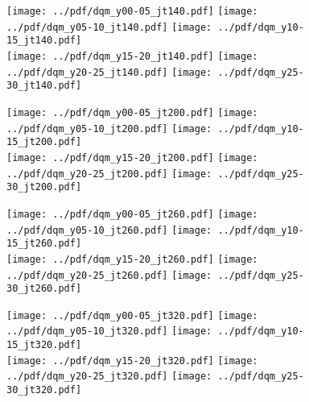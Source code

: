 \documentclass[landscape,10pt]{beamer} %
\begin{document}
\newpage

\begin{figure}[p]
\centering
\texttt{[image: ../pdf/dqm\_y00-05\_jt140.pdf]}
\texttt{[image: ../pdf/dqm\_y05-10\_jt140.pdf]}
\texttt{[image: ../pdf/dqm\_y10-15\_jt140.pdf]}\\
\texttt{[image: ../pdf/dqm\_y15-20\_jt140.pdf]}
\texttt{[image: ../pdf/dqm\_y20-25\_jt140.pdf]}
\texttt{[image: ../pdf/dqm\_y25-30\_jt140.pdf]}
\end{figure}

\newpage

\begin{figure}[p]
\centering
\texttt{[image: ../pdf/dqm\_y00-05\_jt200.pdf]}
\texttt{[image: ../pdf/dqm\_y05-10\_jt200.pdf]}
\texttt{[image: ../pdf/dqm\_y10-15\_jt200.pdf]}\\
\texttt{[image: ../pdf/dqm\_y15-20\_jt200.pdf]}
\texttt{[image: ../pdf/dqm\_y20-25\_jt200.pdf]}
\texttt{[image: ../pdf/dqm\_y25-30\_jt200.pdf]}
\end{figure}

\newpage

\begin{figure}[p]
\centering
\texttt{[image: ../pdf/dqm\_y00-05\_jt260.pdf]}
\texttt{[image: ../pdf/dqm\_y05-10\_jt260.pdf]}
\texttt{[image: ../pdf/dqm\_y10-15\_jt260.pdf]}\\
\texttt{[image: ../pdf/dqm\_y15-20\_jt260.pdf]}
\texttt{[image: ../pdf/dqm\_y20-25\_jt260.pdf]}
\texttt{[image: ../pdf/dqm\_y25-30\_jt260.pdf]}
\end{figure}

\newpage

\begin{figure}[p]
\centering
\texttt{[image: ../pdf/dqm\_y00-05\_jt320.pdf]}
\texttt{[image: ../pdf/dqm\_y05-10\_jt320.pdf]}
\texttt{[image: ../pdf/dqm\_y10-15\_jt320.pdf]}\\
\texttt{[image: ../pdf/dqm\_y15-20\_jt320.pdf]}
\texttt{[image: ../pdf/dqm\_y20-25\_jt320.pdf]}
\texttt{[image: ../pdf/dqm\_y25-30\_jt320.pdf]}
\end{figure}
\end{document}
